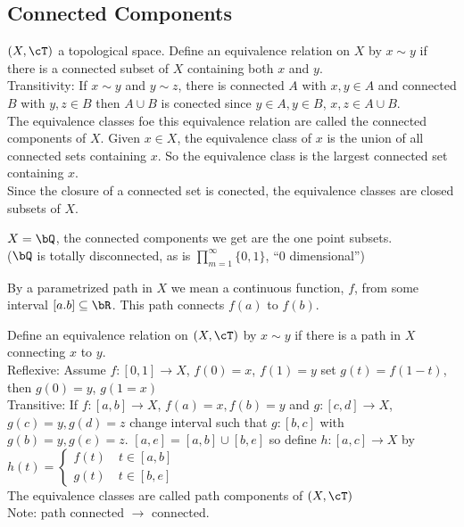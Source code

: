 
\subsection{Connected Components}

$(X, \cT)$ a topological space. Define an equivalence relation on $X$ by $x \sim y$ if there is a connected subset of $X$ containing both $x$ and $y$. \\
Transitivity: If $x \sim y$ and $y \sim z$, there is connected $A$ with $x,y \in A$ and connected $B$ with $y,z \in B$ then $A \cup B$ is conected since $y \in A, y \in B$, $x, z \in A \cup B$. \\
The equivalence classes foe this equivalence relation are called the connected components of $X$. Given $x \in X$, the equivalence class of $x$ is the union of all connected sets containing $x$. So the equivalence class is the largest connected set containing $x$. \\
Since the closure of a connected set is conected, the equivalence classes are closed subsets of $X$. 

\begin{example}
    $X = \bQ$, the connected components we get are the one point subsets. \\
    ($\bQ$ is totally disconnected, as is $\prod_{m=1}^{\infty} \{0, 1\}$, ``0 dimensional'')
\end{example}

\begin{definition}
    By a parametrized path in $X$ we mean a continuous function, $f$, from some interval $[a.b] \subseteq \bR$. This path connects $f(a)$ to $f(b)$. 
\end{definition}

\noindent
Define an equivalence relation on $(X, \cT)$ by $x \sim y$ if there is a path in $X$ connecting $x$ to $y$. \\
Reflexive: Assume $f: [0,1] \to X$, $f(0)=x$, $f(1)=y$ set $g(t) = f(1-t)$, then $g(0)=y$, $g(1=x)$ \\
Transitive: If $f: [a,b] \to X$, $f(a)=x, f(b)=y$ and $g: [c,d] \to X$, $g(c)=y, g(d)=z$ change interval such that $g: [b,c]$ with $g(b)=y, g(e)=z$. $[a, e] = [a,b] \cup [b, e]$ so define $h: [a,c] \to X$ by $h(t) = \begin{cases} f(t) \quad t \in [a,b] \\ g(t) \quad t \in [b,e] \end{cases}$ \\
The equivalence classes are called path components of $(X, \cT)$ \\
Note: path connected $\to$ connected. 

